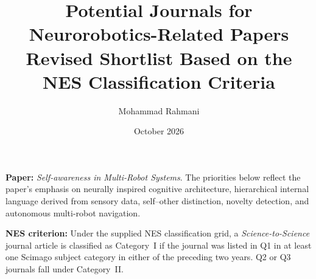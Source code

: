 \documentclass[a4paper,11pt]{article}
\title{Potential Journals for Neurorobotics-Related Papers\\
\large Revised Shortlist Based on the NES Classification Criteria}
\author{Mohammad Rahmani}
\date{October 2026}
\begin{document}
\maketitle

\noindent
\textbf{Paper:} \emph{Self-awareness in Multi-Robot Systems}. The priorities below
reflect the paper's emphasis on neurally inspired cognitive architecture,
hierarchical internal language derived from sensory data, self--other distinction,
novelty detection, and autonomous multi-robot navigation.

\medskip
\noindent
\textbf{NES criterion:} Under the supplied NES classification grid, a
\emph{Science-to-Science} journal article is classified as Category~I if the
journal was listed in Q1 in at least one Scimago subject category in either
of the preceding two years. Q2 or Q3 journals fall under Category~II.

\renewcommand{\arraystretch}{1.2}
\setlength{\tabcolsep}{5pt}
\small
\end{document}
